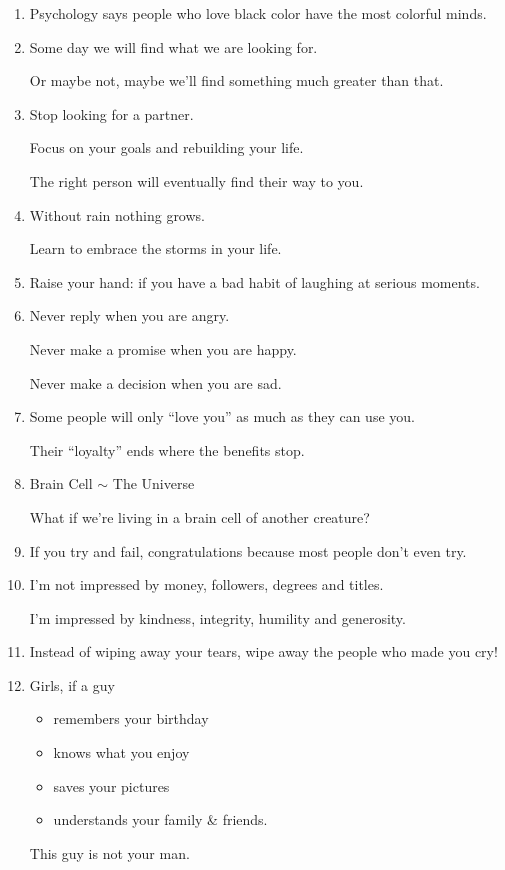 \documentclass{article}
\numberwithin{equation}{section}
\begin{document}
\begin{enumerate}
    \textit{Live happily and tell no one}.
    
    \textit{People ruin beautiful things}.'' - Kahlil Gibran
    \item Psychology says people who love black color have the most colorful minds.
    \item Some day we will find what we are looking for.
    
    Or maybe not, maybe we'll find something much greater than that.
    \item Stop looking for a partner.
    
    Focus on your goals and rebuilding your life.
    
    The right person will eventually find their way to you.
    \item Without rain nothing grows.
    
    Learn to embrace the storms in your life.
    \item Raise your hand: if you have a bad habit of laughing at serious moments.
    \item Never reply when you are angry.
    
    Never make a promise when you are happy.
    
    Never make a decision when you are sad.
    \item Some people will only ``love you'' as much as they can use you.
    
    Their ``loyalty'' ends where the benefits stop.
    \item Brain Cell $\sim$ The Universe
    
    What if we're living in a brain cell of another creature?
    \item If you try and fail, congratulations because most people don't even try.
    \item I'm not impressed by money, followers, degrees and titles.
    
    I'm impressed by kindness, integrity, humility and generosity.
    \item Instead of wiping away your tears, wipe away the people who made you cry!
    \item Girls, if a guy
    \begin{itemize}
        \item remembers your birthday
        \item knows what you enjoy
        \item saves your pictures
        \item understands your family \& friends.
    \end{itemize}
    This guy is not your man.
    

\end{enumerate}
\end{document}
